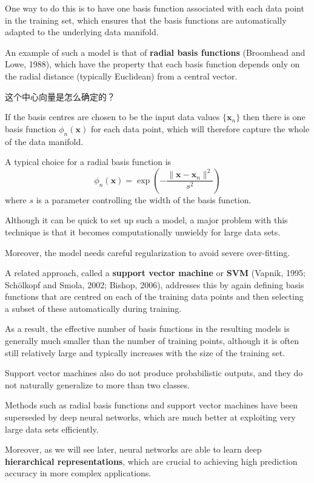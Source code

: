 \documentclass{article}
\begin{document}
One way to do this is to have one basis function associated with each data point in the training set, which ensures that the basis functions are automatically adapted to the underlying data manifold. 

An example of such a model is that of \textbf{radial basis functions} (Broomhead and Lowe, 1988), which have the property that each basis function depends only on the radial distance (typically Euclidean) from a central vector. 

{\color{red}
这个中心向量是怎么确定的？
}

If the basis centres are chosen to be the input data values $\{\mathbf{x}_n\}$ then there is one basis function $\phi_n(\mathbf{x})$ for each data point, which will therefore capture the whole of the data manifold. 

A typical choice for a radial basis function is
\begin{equation}
\phi_n(\mathbf{x}) = \exp\left( -\frac{\|\mathbf{x} - \mathbf{x}_n\|^2}{s^2} \right)
\end{equation}
where $s$ is a parameter controlling the width of the basis function. 

Although it can be quick to set up such a model, a major problem with this technique is that it becomes computationally unwieldy for large data sets. 

Moreover, the model needs careful regularization to avoid severe over-fitting.

A related approach, called a \textbf{support vector machine} or \textbf{SVM} (Vapnik, 1995; Schölkopf and Smola, 2002; Bishop, 2006), addresses this by again defining basis functions that are centred on each of the training data points and then selecting a subset of these automatically during training. 

As a result, the effective number of basis functions in the resulting models is generally much smaller than the number of training points, although it is often still relatively large and typically increases with the size of the training set. 

Support vector machines also do not produce probabilistic outputs, and they do not naturally generalize to more than two classes. 

Methods such as radial basis functions and support vector machines have been superseded by deep neural networks, which are much better at exploiting very large data sets efficiently. 

Moreover, as we will see later, neural networks are able to learn deep \textbf{hierarchical representations}, which are crucial to achieving high prediction accuracy in more complex applications.
\end{document}
